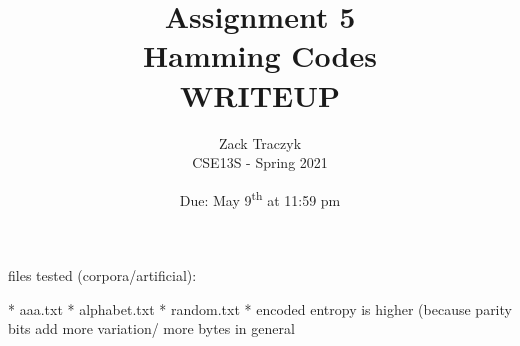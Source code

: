 \documentclass[12pt]{article}
\title{%
	\textbf{Assignment 5 \\ 
		Hamming Codes \\
\large WRITEUP} }
\author{Zack Traczyk \\ CSE13S - Spring 2021}
\date{Due: May 9\textsuperscript{th} at 11:59 pm}
\begin{document}
\maketitle

files tested (corpora/artificial):

  * aaa.txt
  * alphabet.txt
  * random.txt
* encoded entropy is higher (because parity bits add more variation/ more bytes
in general
\end{document}
